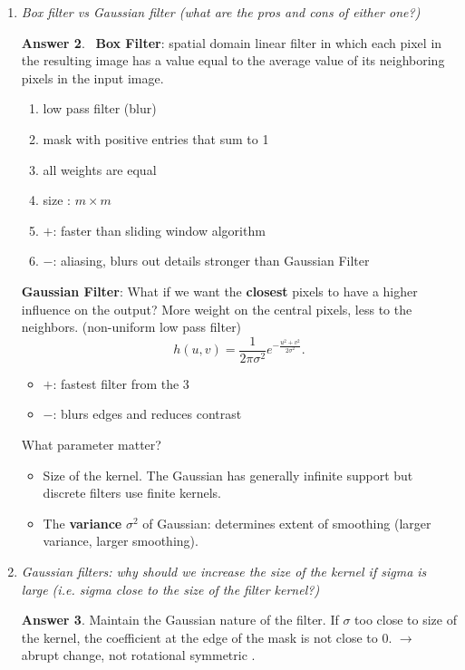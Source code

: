 \documentclass[a4paper,12 pt]{article}
\theoremstyle{definition}
\theoremstyle{remark}
\theoremstyle{definition}
\theoremstyle{definition}
\theoremstyle{definition}
\theoremstyle{definition}
\theoremstyle{remark}
\theoremstyle{remark}
\theoremstyle{definition}
\theoremstyle{definition}
\newtheorem*{answer}{Answer}
\begin{document}
\begin{enumerate}
\begin{answer}
\begin{figure}[h!]
\begin{center}
\caption{Convolution. Cross-correlation. Autocorrelation \label{convolution}}
\end{center}
\end{figure}
\end{answer}
\item \textit{Box filter vs Gaussian filter (what are the pros and cons of either one?)}
\begin{answer}
\
\textbf{Box Filter}: spatial domain linear filter in which each pixel in the resulting image has a value equal to the average value of its neighboring pixels in the input image.
\begin{enumerate}
\item low pass filter (blur)
\item mask with positive entries that sum to 1 
\item all weights are equal
\item size : $m\times m$
\item $+$: faster than sliding window algorithm
\item $-$: aliasing, blurs out details stronger than Gaussian Filter
\end{enumerate}
\textbf{Gaussian Filter}: 
What if we want the \textbf{closest} pixels to have a higher influence on the output? More weight on the central pixels, less to the neighbors. (non-uniform low pass filter)
\begin{equation}
h(u,v)=\frac{1}{2\pi \sigma^2}e^{-\frac{u^2+v^2}{2\sigma^2}}.
\end{equation}
\begin{itemize}
\item $+$: fastest filter from the 3
\item $-$: blurs edges and reduces contrast
\end{itemize}
What parameter matter? 
\begin{itemize}
\item Size of the kernel. The Gaussian has generally infinite support but discrete filters use finite kernels. 
\item The \textbf{variance} $\sigma^2$ of Gaussian: determines extent of smoothing (larger variance, larger smoothing).
\end{itemize}
\end{answer}
\item \textit{Gaussian filters: why should we increase the size of the kernel if sigma is large (i.e. sigma close to the size of the filter kernel?)}
\begin{answer}
Maintain the Gaussian nature of the filter. If $\sigma$ too close to size of the kernel, the coefficient at the edge of the mask is not close to 0. $\rightarrow$ abrupt change, not rotational symmetric .

\end{answer}
\end{enumerate}
\end{document}
